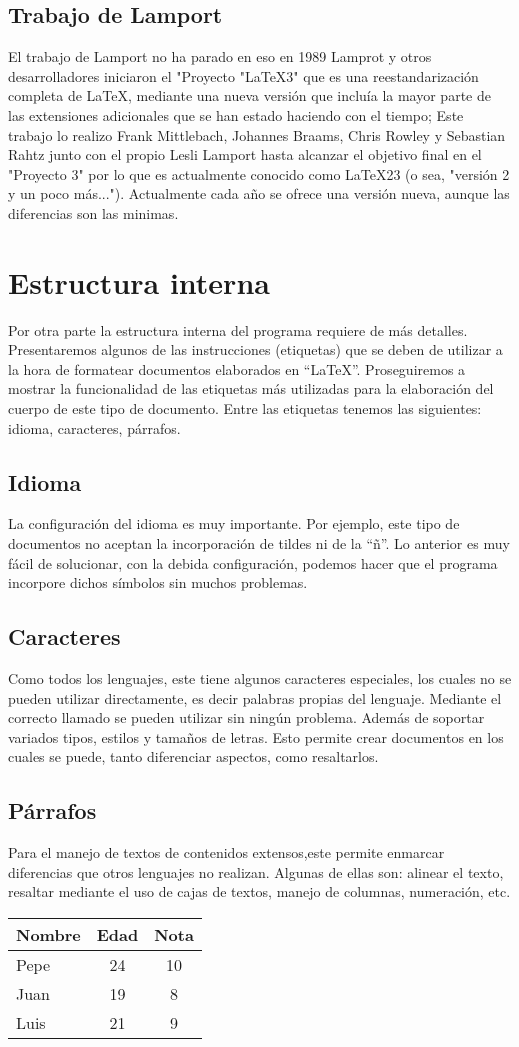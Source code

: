 \documentclass[a4paper,12pt]{article}
\begin{document}
\subsection{Trabajo de Lamport}
El trabajo de Lamport  no ha parado en eso en 1989 Lamprot y otros desarrolladores iniciaron el "Proyecto "LaTeX3" 
que es una reestandarización completa de LaTeX, mediante una nueva versión que incluía la mayor parte de las 
extensiones adicionales que  se han estado haciendo con el tiempo; Este trabajo lo realizo Frank Mittlebach, 
Johannes Braams, Chris Rowley y Sebastian Rahtz junto con el propio Lesli Lamport hasta alcanzar el objetivo final
en el "Proyecto 3"  por lo que es actualmente conocido como LaTeX23 (o sea, "versión 2 y un poco más...").
Actualmente cada año se ofrece una versión nueva, aunque las diferencias son las minimas.

\section{Estructura interna}
Por otra parte la estructura interna del programa requiere de más detalles. Presentaremos algunos de las instrucciones
(etiquetas) que se deben de utilizar a la hora de formatear documentos elaborados en “LaTeX”. Proseguiremos
a mostrar la funcionalidad de las etiquetas más utilizadas para la elaboración del cuerpo de este tipo de
documento. Entre las etiquetas tenemos las siguientes: idioma, caracteres, párrafos.
\subsection{Idioma}
La configuración del idioma es muy importante. Por ejemplo, este tipo de documentos no aceptan la incorporación
de tildes ni de la “ñ”. Lo anterior es muy fácil de solucionar, con la debida configuración, podemos hacer que el
programa incorpore dichos símbolos sin muchos problemas.
\subsection{Caracteres}
Como todos los lenguajes, este tiene algunos caracteres especiales, los cuales no se pueden utilizar directamente,
es decir palabras propias del lenguaje. Mediante el correcto llamado se pueden utilizar sin ningún problema. Además
de soportar variados tipos, estilos y tamaños de letras. Esto permite crear documentos en los cuales se puede, tanto
diferenciar aspectos, como resaltarlos.
\subsection{Párrafos}
 Para el manejo de textos de contenidos extensos,este permite enmarcar diferencias que otros lenguajes no realizan.
Algunas de ellas son: alinear el texto, resaltar mediante el uso de cajas de textos, manejo de columnas, numeración,
etc.

\bigskip
 \begin{tabular}{|l|c|c|}
 \hline
 Nombre & Edad & Nota \\ \hline
 Pepe & 24 & 10 \\ \hline
 Juan & 19 & 8 \\ \hline
 Luis & 21 & 9 \\ \hline
 \end{tabular}
\end{document}
